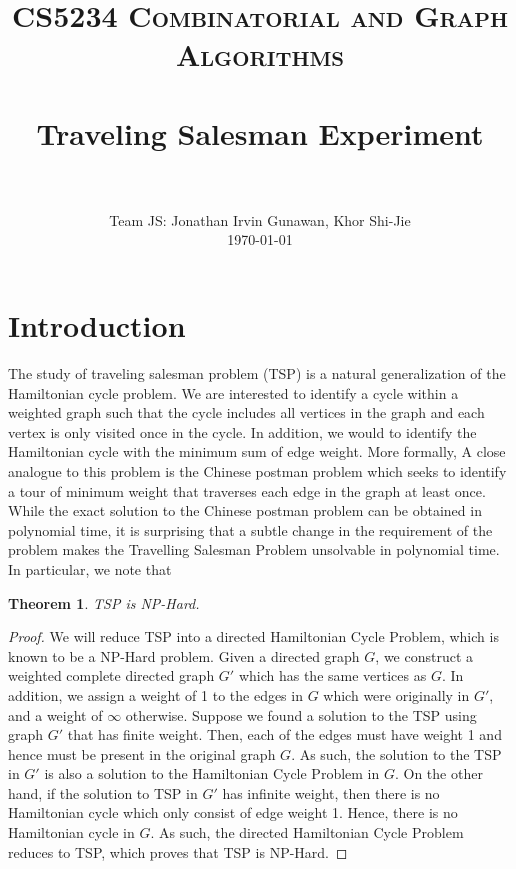 \documentclass[paper=a4, fontsize=11pt]{scrartcl}	%
\title{
		\usefont{OT1}{bch}{b}{n}
		\normalfont \normalsize \textsc{CS5234 Combinatorial and Graph Algorithms} \\ [25pt]
		\horrule{0.5pt} \\[0.4cm]
		\huge Traveling Salesman Experiment \\
		\horrule{2pt} \\[0.5cm]
}
\author{
		\normalfont 								\normalsize
       Team JS: Jonathan Irvin Gunawan, Khor Shi-Jie\\[-3pt]		\normalsize
        \today
}
\date{}
\numberwithin{equation}{section}		%
\numberwithin{figure}{section}			%
\numberwithin{table}{section}				%
\newtheorem{theorem}{Theorem}
\begin{document}
\maketitle

\section{Introduction}
The study of traveling salesman problem (TSP) is a natural generalization of the Hamiltonian cycle problem. We are interested to identify a cycle within a weighted graph such that the cycle includes all vertices in the graph and each vertex is only visited once in the cycle. In addition, we would to identify the Hamiltonian cycle with the minimum sum of edge weight. More formally, A close analogue to this problem is the Chinese postman problem which seeks to identify a tour of minimum weight that traverses each edge in the graph at least once. While the exact solution to the Chinese postman problem can be obtained in polynomial time, it is surprising that a subtle change in the requirement of the problem makes the Travelling Salesman Problem unsolvable in polynomial time. In particular, we note that

\begin{theorem}
TSP is NP-Hard.
\end{theorem}

\begin{proof}
We will reduce TSP into a directed Hamiltonian Cycle Problem, which is known to be a NP-Hard problem. Given a directed graph $G$, we construct a weighted complete directed graph $G'$ which has the same vertices as $G$. In addition, we assign a weight of 1 to the edges in $G$ which were originally in $G'$, and a weight of $\infty$ otherwise. Suppose we found a solution to the TSP using graph $G'$ that has finite weight. Then, each of the edges must have weight 1 and hence must be present in the original graph $G$. As such, the solution to the TSP in $G'$ is also a solution to the Hamiltonian Cycle Problem in $G$. On the other hand, if the solution to TSP in $G'$ has infinite weight, then there is no Hamiltonian cycle which only consist of edge weight 1. Hence, there is no Hamiltonian cycle in $G$. As such, the directed Hamiltonian Cycle Problem reduces to TSP, which proves that TSP is NP-Hard.
\end{proof}
\end{document}
